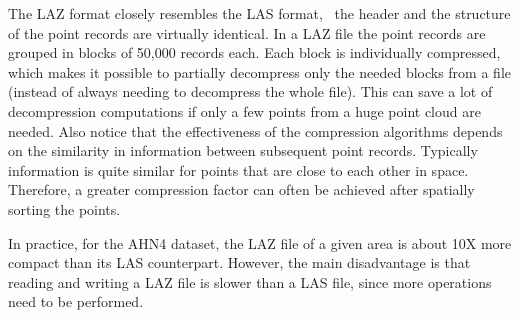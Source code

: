 The LAZ format closely resembles the LAS format, \ie\ the header and the structure of the point records are virtually identical.
In a LAZ file the point records are grouped in blocks of 50,000 records each.
Each block is individually compressed, which makes it possible to partially decompress only the needed blocks from a file (instead of always needing to decompress the whole file).
This can save a lot of decompression computations if only a few points from a huge point cloud are needed.
Also notice that the effectiveness of the compression algorithms depends on the similarity in information between subsequent point records.
Typically information is quite similar for points that are close to each other in space.
Therefore, a greater compression factor can often be achieved after spatially sorting the points.

In practice, for the AHN4 dataset, the LAZ file of a given area is about 10X more compact than its LAS counterpart.
However, the main disadvantage is that reading and writing a LAZ file is slower than a LAS file, since more operations need to be performed.


